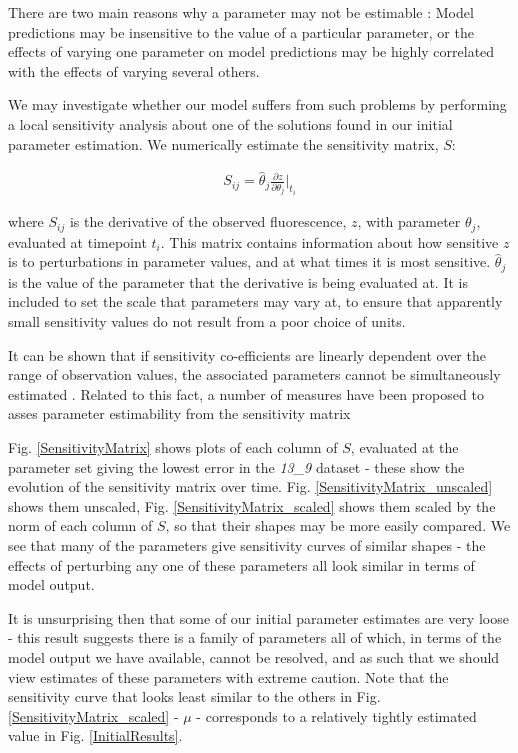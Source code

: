\documentclass[10pt,journal]{./IEEE_latex_class/IEEEtran}
\begin{document}
 There are two main reasons why a parameter may not be estimable  \cite{Mclean2012,Yao2003, Beck}: Model predictions may be insensitive to the value of a particular parameter, or the effects of varying one parameter on model predictions may be highly correlated with the effects of varying several others.
 
 We may investigate whether our model suffers from such problems by performing a local sensitivity analysis about one of the solutions found in our initial parameter estimation. We numerically estimate the sensitivity matrix, $S$:
 
 \begin{align}
S_{ij} = \hat{\theta}_{j} \frac{\partial z}{ \partial \theta_{j}}\Bigr|_{t_{i}}
\end{align}

where $S_{ij}$ is the derivative of the observed fluorescence, $z$, with parameter $\theta_{j}$, evaluated at timepoint $t_{i}$. This matrix contains information about how sensitive $z$ is to perturbations in parameter values, and at what times it is most sensitive. $\hat{\theta}_{j}$ is the value of the parameter that the derivative is being evaluated at. It is included to set the scale that parameters may vary at, to ensure that apparently small sensitivity values do not result from a poor choice of units.

It can be shown that if sensitivity co-efficients are linearly dependent over the range of observation values, the associated parameters cannot be simultaneously estimated \cite{Beck}. Related to this fact, a number of measures have been proposed to asses parameter estimability from the sensitivity matrix \cite{Mclean2012}

Fig. \ref{SensitivityMatrix} shows plots of each column of $S$, evaluated at the parameter set giving the lowest error in the \textit{13\_9} dataset - these show the evolution of the sensitivity matrix over time. Fig. \ref{SensitivityMatrix_unscaled} shows them unscaled, Fig. \ref{SensitivityMatrix_scaled} shows them scaled by the norm of each column of $S$, so that their shapes may be more easily compared. We see that many of the parameters give sensitivity curves of similar shapes - the effects of perturbing any one of these parameters all look similar in terms of model output. 


 It is unsurprising then that some of our initial parameter estimates are very loose - this result suggests there is a family of parameters all of which, in terms of the model output we have available, cannot be resolved, and as such that we should view estimates of these parameters with extreme caution. Note that the sensitivity curve that looks least similar to the others in Fig. \ref{SensitivityMatrix_scaled} - $\mu$ - corresponds to a relatively tightly estimated value in Fig. \ref{InitialResults}.
 
\end{document}
